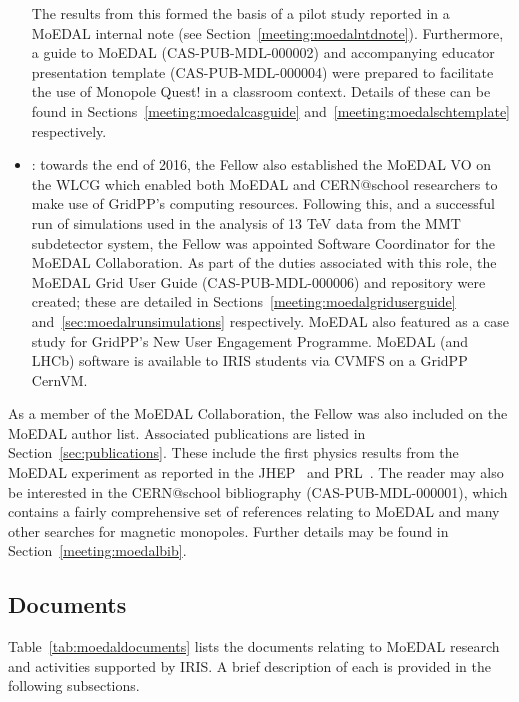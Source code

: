 \begin{itemize}
The results from this formed the basis of a pilot study
reported in a \acs{MoEDAL} internal note
(see Section~\ref{meeting:moedalntdnote}).
Furthermore, a guide to MoEDAL (CAS-PUB-MDL-000002)
and accompanying educator presentation template (CAS-PUB-MDL-000004)
were prepared to facilitate the use of Monopole Quest! in
a classroom context. Details of these can be found in
Sections~\ref{meeting:moedalcasguide} and~\ref{meeting:moedalschtemplate}
respectively.
%
\item {}:
towards the end of 2016, the Fellow also established the
\acs{MoEDAL} \acf{VO} on the \acf{WLCG} which enabled both
\acs{MoEDAL} and CERN@school researchers to make use of
GridPP's computing resources.
Following this, and a successful run of simulations used in the
analysis of 13 TeV data from the
\acf{MMT} subdetector system,
the Fellow was appointed Software Coordinator for the
\acs{MoEDAL} Collaboration.
As part of the duties associated with this role,
the MoEDAL Grid User Guide (CAS-PUB-MDL-000006)
and  repository
were created; these are detailed in Sections~\ref{meeting:moedalgriduserguide}
and~\ref{sec:moedalrunsimulations} respectively.
MoEDAL also featured as a case study for
GridPP's New User Engagement Programme.
MoEDAL (and \acs{LHCb}) software is available to
\acs{IRIS} students via \acs{CVMFS} on a GridPP CernVM.
\end{itemize}

As a member of the \acs{MoEDAL} Collaboration,
the Fellow was also included on the \acs{MoEDAL} author list.
Associated publications are listed in Section~\ref{sec:publications}.
These include the first physics results from the \acs{MoEDAL}
experiment as reported in the \acf{JHEP}~\cite{MoEDAL2016a}
and \acf{PRL}~\cite{MoEDAL2017a}.
The reader may also be interested in
the CERN@school bibliography (CAS-PUB-MDL-000001),
which contains a fairly comprehensive set of references
relating to MoEDAL and many other searches for magnetic monopoles.
Further details may be found in Section~\ref{meeting:moedalbib}.

\clearpage

\subsection{Documents}
\label{sec:moedaldocuments}
Table~\ref{tab:moedaldocuments} lists the documents relating to
\acs{MoEDAL} research and activities supported by \acs{IRIS}.
A brief description of each is provided 
in the following subsections.

